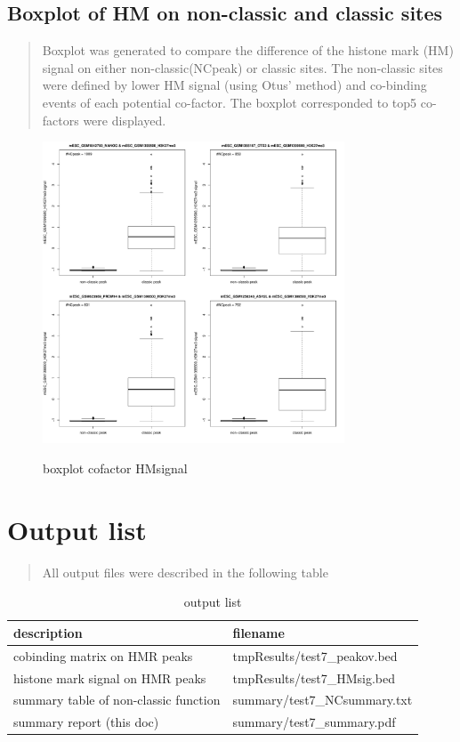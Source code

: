 \documentclass[11pt,a4paper]{article}
\begin{document}
\subsection{Boxplot of HM on non-classic and classic sites}
\begin{quotation}
Boxplot was generated to compare the difference of the histone mark (HM) signal on either non-classic(NCpeak) or classic sites. The non-classic sites were defined by lower HM signal (using Otus' method) and co-binding events of each potential co-factor. The boxplot corresponded to top5 co-factors were displayed.  
\end{quotation}
\begin{figure}[h]
        \caption{boxplot cofactor HMsignal} \label{fig:profileunion}
        \setlength{\abovecaptionskip}{0pt}
        \setlength{\belowcaptionskip}{10pt}
        \centering
        {\includegraphics[width=0.8\textwidth]{test7_coTF_HMsignal.pdf}}
\end{figure}

\newpage
\newpage
\section{Output list}
\begin{quotation}
All output files were described in the following table
\end{quotation}
\begin{table}[h]
\small
\caption{output list}\label{bstable}
\begin{tabular}{ |l|l| }
    
\hline
description & filename \\
\hline
cobinding matrix on HMR peaks & tmpResults/test7\_peakov.bed \\
\hline
histone mark signal on HMR peaks & tmpResults/test7\_HMsig.bed \\
\hline
summary table of non-classic function & summary/test7\_NCsummary.txt \\
\hline
summary report (this doc) & summary/test7\_summary.pdf \\
\hline

\end{tabular}
\end{table} 
\end{document}
